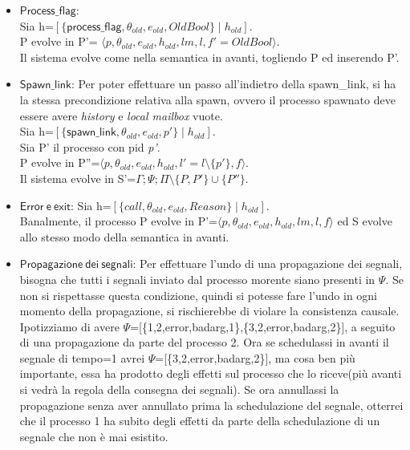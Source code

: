 \documentclass[Contributo.tex]{subfiles}
\begin{document}
	\begin{itemize}
		\item $\mathsf{Process\_flag}$:\\
		Sia h=$\displaystyle [\{\mathsf{process\_flag},\theta_{old},e_{old},OldBool\} \mid h_{old}]$.\\
		P evolve in P'= $\displaystyle \langle p,\theta_{old},e_{old},h_{old},lm,l,f'=OldBool \rangle$.\\
		Il sistema evolve come nella semantica in avanti, togliendo P ed inserendo P'.
		\item $\mathsf{Spawn\_link}$:
		Per poter effettuare un passo all'indietro della spawn\_link, si ha la stessa precondizione relativa alla spawn, ovvero il processo spawnato deve essere avere \textit{history} e \textit{local mailbox} vuote.\\
		Sia h=$\displaystyle [\{\mathsf{spawn\_link},\theta_{old},e_{old},p'\} \mid h_{old}]$.\\
		Sia P' il processo con pid \textit{p'}.\\
		P evolve in P''=$\displaystyle \langle p,\theta_{old},e_{old},h_{old},l'=l \setminus \{p'\},f \rangle$.\\
		Il sistema evolve in S'=$\displaystyle \Gamma;\Psi;\Pi\setminus\{P,P'\}\cup\{P''\}$.
		\item $\mathsf{Error~e~exit}$: Sia h=$\displaystyle [\{call,\theta_{old},e_{old},Reason\} \mid h_{old}]$.\\
		Banalmente, il processo P evolve in P'=$\displaystyle \langle p,\theta_{old},e_{old},h_{old},lm,l,f \rangle$ ed S evolve allo stesso modo della semantica in avanti.
		\item $\mathsf{Propagazione~dei~segnali}$: Per effettuare l'undo di una propagazione dei segnali, bisogna che tutti i segnali inviato dal processo morente siano presenti in $\Psi$.
		Se non si rispettasse questa condizione, quindi si potesse fare l'undo in ogni momento della propagazione, si rischierebbe di violare la consistenza causale.\\
		Ipotizziamo di avere $\Psi$=[\{1,2,error,badarg,1\},\{3,2,error,badarg,2\}], a seguito di una propagazione da parte del processo 2. Ora se schedulassi in avanti il segnale di tempo=1 avrei $\Psi$=[\{3,2,error,badarg,2\}], ma cosa ben più importante, essa ha prodotto degli effetti sul processo che lo riceve(più avanti si vedrà la regola della consegna dei segnali). Se ora annullassi la propagazione senza aver annullato prima la schedulazione del segnale, otterrei che il processo 1 ha subito degli effetti da parte della schedulazione di un segnale che non è mai esistito.

\end{itemize}
\end{document}
